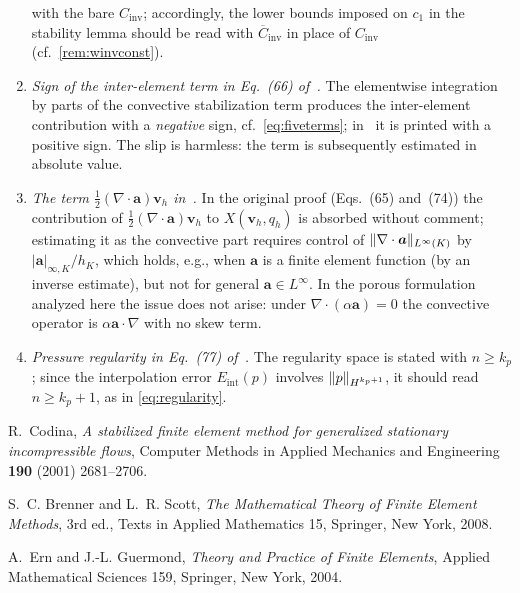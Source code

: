 \documentclass[11pt,a4paper]{article}
\newcommand{\bv}{\boldsymbol{v}}
\newcommand{\ba}{\boldsymbol{a}}
\newcommand{\Cinv}{C_{\mathrm{inv}}}
\newcommand{\Cinva}{\overline{C}_{\mathrm{inv}}}
\DeclarePairedDelimiter{\norm}{\lVert}{\rVert}
\theoremstyle{plain}
\theoremstyle{remark}
\theoremstyle{definition}
\numberwithin{equation}{section}
\begin{document}
\begin{enumerate}[label=\textup{(A\arabic*)},leftmargin=3.2em,itemsep=2pt]
with the bare $\Cinv$; accordingly, the lower bounds imposed on $c_1$ in the stability
lemma should be read with $\Cinva$ in place of $\Cinv$ (cf.\ \cref{rem:winvconst}).
\item\label{am:codinasign}
\emph{Sign of the inter-element term in Eq.~(66) of~\cite{codina2001}.} The elementwise
integration by parts of the convective stabilization term produces the inter-element
contribution with a \emph{negative} sign, cf.\ \eqref{eq:fiveterms}; in~\cite{codina2001}
it is printed with a positive sign. The slip is harmless: the term is subsequently
estimated in absolute value.
\item\label{am:codinadiva}
\emph{The term $\tfrac12(\nabla\cdot\ba)\bv_h$ in~\cite{codina2001}.} In the original
proof (Eqs.~(65) and~(74)) the contribution of $\tfrac12(\nabla\cdot\ba)\bv_h$ to
$X(\bv_h,q_h)$ is absorbed without comment; estimating it as the convective part requires
control of $\norm{\nabla\cdot\ba}_{L^\infty(K)}$ by $|\ba|_{\infty,K}/h_K$, which holds,
e.g., when $\ba$ is a finite element function (by an inverse estimate), but not for
general $\ba\in L^\infty$. In the porous formulation analyzed here the issue does not
arise: under $\nabla\cdot(\alpha\ba)=0$ the convective operator is $\alpha\ba\cdot\nabla$
with no skew term.
\item\label{am:codinaregularity}
\emph{Pressure regularity in Eq.~(77) of~\cite{codina2001}.} The regularity space is
stated with $n\ge k_p$; since the interpolation error
$E_{\mathrm{int}}(p)$ involves $\norm{p}_{H^{k_p+1}}$, it should read $n\ge k_p+1$, as in
\eqref{eq:regularity}.
\end{enumerate}

\begin{thebibliography}{9}
R.~Codina,
\emph{A stabilized finite element method for generalized stationary incompressible
flows},
Computer Methods in Applied Mechanics and Engineering \textbf{190} (2001) 2681--2706.

S.~C. Brenner and L.~R. Scott,
\emph{The Mathematical Theory of Finite Element Methods}, 3rd ed.,
Texts in Applied Mathematics 15, Springer, New York, 2008.

A.~Ern and J.-L. Guermond,
\emph{Theory and Practice of Finite Elements},
Applied Mathematical Sciences 159, Springer, New York, 2004.
\end{thebibliography}
\end{document}
